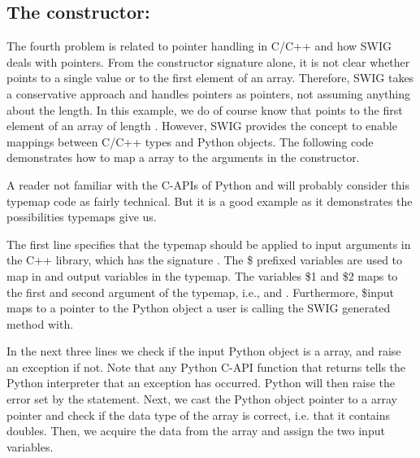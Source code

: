 \subsection{The constructor: }
The fourth problem is related to pointer handling in C/C++ and how SWIG deals with pointers. From the constructor signature alone, it is not clear whether  points to a single value or to the first element of an array.
Therefore, SWIG takes a conservative approach and handles pointers as pointers, not assuming anything about the length. In this example, we do of course know that  points to the first element of an array of length . However, SWIG provides the  concept to enable mappings between C/C++ types and Python objects. The following code demonstrates how to map a \numpy array to the  arguments in the constructor.
A reader not familiar with the C-APIs of Python and \numpy will probably consider this typemap code as fairly technical. But it is a good example as it demonstrates the possibilities typemaps give us.\par
The first line specifies that the typemap should be applied to input  arguments in the C++ library, which has the signature . The \$ prefixed variables are used to map in and output variables in the typemap. The variables \$1 and \$2 maps to the first and second argument of the typemap, i.e.,  and . Furthermore, \$input maps to a pointer to the Python object a user is calling the SWIG generated method with. \par
In the next three lines we check if the input Python object is a \numpy array, and raise an exception if not.
Note that any Python C-API function that returns  tells the Python interpreter that an exception has occurred. Python will then raise the error set by the  statement. Next, we cast the Python object pointer to a \numpy array pointer and check if the data type of the \numpy array is correct, i.e. that it contains doubles. Then, we acquire the data from the \numpy array and assign the two input variables.\par

